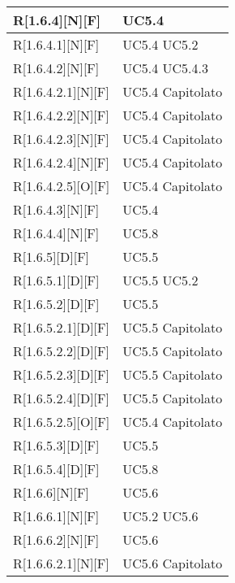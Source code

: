 \begin{longtable}{X | X}
\hline
R[1.6.4][N][F] & UC5.4 \\
\hline
R[1.6.4.1][N][F] & UC5.4 \newline UC5.2 \\
\hline
R[1.6.4.2][N][F] & UC5.4 \newline UC5.4.3 \\
\hline
R[1.6.4.2.1][N][F] & UC5.4 \newline Capitolato \\
\hline
R[1.6.4.2.2][N][F] & UC5.4 \newline Capitolato \\
\hline
R[1.6.4.2.3][N][F] & UC5.4 \newline Capitolato \\
\hline
R[1.6.4.2.4][N][F] & UC5.4 \newline Capitolato \\
\hline
R[1.6.4.2.5][O][F] & UC5.4 \newline Capitolato \\
\hline
R[1.6.4.3][N][F] & UC5.4 \\
\hline
R[1.6.4.4][N][F] & UC5.8 \\
\hline
R[1.6.5][D][F] & UC5.5 \\
\hline
R[1.6.5.1][D][F] & UC5.5 \newline UC5.2 \\
\hline
R[1.6.5.2][D][F] & UC5.5 \\
\hline
R[1.6.5.2.1][D][F] & UC5.5 \newline Capitolato \\
\hline
R[1.6.5.2.2][D][F] & UC5.5 \newline Capitolato \\
\hline
R[1.6.5.2.3][D][F] & UC5.5 \newline Capitolato \\
\hline
R[1.6.5.2.4][D][F] & UC5.5 \newline Capitolato \\
\hline
R[1.6.5.2.5][O][F] & UC5.4 \newline Capitolato \\
\hline
R[1.6.5.3][D][F] & UC5.5 \\
\hline
R[1.6.5.4][D][F] & UC5.8 \\
\hline
R[1.6.6][N][F] & UC5.6 \\
\hline
R[1.6.6.1][N][F] & UC5.2 \newline UC5.6 \\
\hline
R[1.6.6.2][N][F] & UC5.6 \\
\hline
R[1.6.6.2.1][N][F] & UC5.6 \newline Capitolato \\

\end{longtable}
